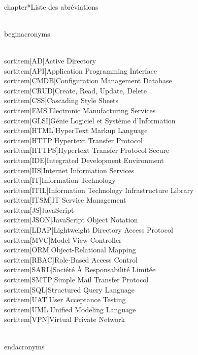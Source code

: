 
\\chapter*{Liste des abréviations}


\\begin{acronyms}
    
   \\sortitem[AD]{Active Directory}
   \\sortitem[API]{Application Programming Interface}
   \\sortitem[CMDB]{Configuration Management Database}
   \\sortitem[CRUD]{Create, Read, Update, Delete}
   \\sortitem[CSS]{Cascading Style Sheets}
   \\sortitem[EMS]{Electronic Manufacturing Services}
   \\sortitem[GLSI]{Génie Logiciel et Système d'Information}
   \\sortitem[HTML]{HyperText Markup Language}
   \\sortitem[HTTP]{Hypertext Transfer Protocol}
   \\sortitem[HTTPS]{Hypertext Transfer Protocol Secure}
   \\sortitem[IDE]{Integrated Development Environment}
   \\sortitem[IIS]{Internet Information Services}
   \\sortitem[IT]{Information Technology}
   \\sortitem[ITIL]{Information Technology Infrastructure Library}
   \\sortitem[ITSM]{IT Service Management}
   \\sortitem[JS]{JavaScript}
   \\sortitem[JSON]{JavaScript Object Notation}
   \\sortitem[LDAP]{Lightweight Directory Access Protocol}
   \\sortitem[MVC]{Model View Controller}
   \\sortitem[ORM]{Object-Relational Mapping}
   \\sortitem[RBAC]{Role-Based Access Control}
   \\sortitem[SARL]{Société À Responsabilité Limitée}
   \\sortitem[SMTP]{Simple Mail Transfer Protocol}
   \\sortitem[SQL]{Structured Query Language}
   \\sortitem[UAT]{User Acceptance Testing}
   \\sortitem[UML]{Unified Modeling Language}
   \\sortitem[VPN]{Virtual Private Network}

\\end{acronyms}